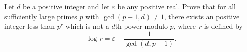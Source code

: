 Let $d$ be a positive integer and let $\varepsilon$ be any positive real. Prove that for all sufficiently large primes $p$ with $\gcd(p-1,d) \neq 1$, there exists an positive integer less than $p^r$ which is not a $d$th power modulo $p$, where $r$ is defined by \[ \log r = \varepsilon - \frac{1}{\gcd(d,p-1)}. \]